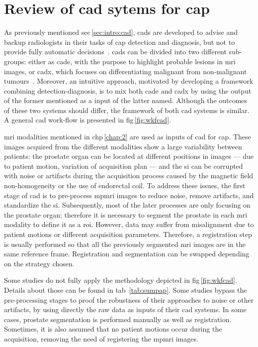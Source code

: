 \section{Review of \acs*{cad} sytems for \ac{cap}}\label{chap:3}
\graphicspath{{3_review/figures/}}



As previously mentioned \acs{sec}\,\ref{sec:intro:cad}, \acp{cad} are developed
to advise and backup radiologists in their tasks of \ac{cap} detection and
diagnosis, but not to provide fully automatic decisions~\cite{Giger2008}.
\acp{cad} can be divided into two different sub-groups: either as \ac{cade},
with the purpose to highlight probable lesions in \ac{mri} images, or
\ac{cadx}, which focuses on differentiating malignant from non-malignant
tumours~\cite{Giger2008}.
Moreover, an intuitive approach, motivated by developing a framework combining
detection-diagnosis, is to mix both \ac{cade} and \ac{cadx} by using the output
of the former mentioned as a input of the latter named.
Although the outcomes of these two systems should differ, the framework of both
\ac{cad} systems is similar.
A general \ac{cad} work-flow is presented in \acs{fig}\,\ref{fig:wkfcad}.

\ac{mri} modalities mentioned in \acs{chp}\,\ref{chap:2} are used as inputs of
\ac{cad} for \ac{cap}.
These images acquired from the different modalities show a large variability
between patients: the prostate organ can be located at different positions in
images --- due to patient motion, variation of acquisition plan --- and the
\ac{si} can be corrupted with noise or artifacts during the acquisition process
caused by the magnetic field non-homogeneity or the use of endorectal coil.
To address these issues, the first stage of \ac{cad} is to pre-process
\ac{mpmri} images to reduce noise, remove artifacts, and standardize the
\ac{si}.
Subsequently, most of the later processes are only focusing on the prostate
organ; therefore it is necessary to segment the prostate in each \ac{mri}
modality to define it as a \ac{roi}.
However, data may suffer from misalignment due to patient motions or different
acquisition parameters.
Therefore, a registration step is usually performed so that all the previously
segmented \ac{mri} images are in the same reference frame.
Registration and segmentation can be swapped depending on the strategy chosen.

Some studies do not fully apply the methodology depicted in
\acs{fig}\,\ref{fig:wkfcad}.
Details about those can be found in \acs{tab}~\ref{tab:sumpap}.
Some studies bypass the pre-processing stages to proof the robustness of their
approaches to noise or other artifacts, by using directly the raw data as
inputs of their \ac{cad} systems.
In some cases, prostate segmentation is performed manually as well as
registration.
Sometimes, it is also assumed that no patient motions occur during the
acquisition, removing the need of registering the \ac{mpmri} images.

